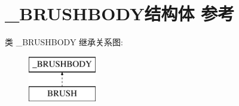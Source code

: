 \hypertarget{struct___b_r_u_s_h_b_o_d_y}{}\section{\+\_\+\+B\+R\+U\+S\+H\+B\+O\+D\+Y结构体 参考}
\label{struct___b_r_u_s_h_b_o_d_y}
类 \+\_\+\+B\+R\+U\+S\+H\+B\+O\+DY 继承关系图\+:\begin{figure}[H]
\begin{center}
\leavevmode
\includegraphics[height=2.000000cm]{struct___b_r_u_s_h_b_o_d_y}
\end{center}
\end{figure}

